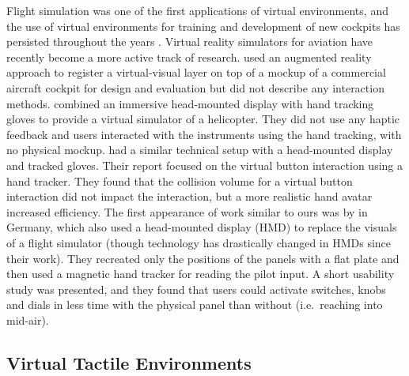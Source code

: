 Flight simulation was one of the first applications of virtual environments, and the use of virtual environments for training and development of new cockpits has persisted throughout the years \citep{hancock_human_2008}.
Virtual reality simulators for aviation have recently become a more active track of research.
\citet{wan_mrstudio:_2011} used an augmented reality approach to register a virtual-visual layer on top of a mockup of a commercial aircraft cockpit for design and evaluation but did not describe any interaction methods.
\citet{yavrucuk_low_2011} combined an immersive head-mounted display with hand tracking gloves to provide a virtual simulator of a helicopter.
They did not use any haptic feedback and users interacted with the instruments using the hand tracking, with no physical mockup.
\citet{aslandere_virtual_2015} had a similar technical setup with a head-mounted display and tracked gloves.
Their report focused on the virtual button interaction using a hand tracker.
They found that the collision volume for a virtual button interaction did not impact the interaction, but a more realistic hand avatar increased efficiency.
The first appearance of work similar to ours was by \citet{schiefele_simple_1998} in Germany, which also used a head-mounted display (HMD) to replace the visuals of a flight simulator (though technology has drastically changed in HMDs since their work).
They recreated only the positions of the panels with a flat plate and then used a magnetic hand tracker for reading the pilot input.
A short usability study was presented, and they found that users could activate switches, knobs and dials in less time with the physical panel than without (i.e.\ reaching into mid-air).


\subsection{Virtual Tactile Environments}
\label{virtual-tactile-environments}

